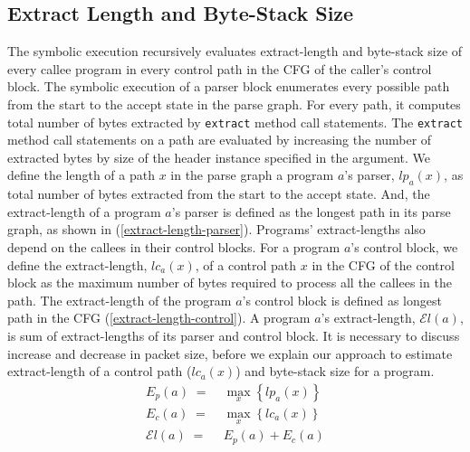 

\subsection{Extract Length and Byte-Stack Size}
\label{subsection:extract-length-and-byte-stack-size}
The symbolic execution recursively evaluates extract-length and byte-stack size of every callee program in every control path in the CFG of the caller's control block.
The symbolic execution of a parser block enumerates every possible path from the start to the accept state in the parse graph.
For every path, it computes total number of bytes extracted by \texttt{extract} method call statements.
The \texttt{extract} method call statements on a path are evaluated by increasing the number of extracted bytes by size of the header instance specified in the argument.
We define the length of a path $x$ in the parse graph a program $a$'s parser, $lp_{a}(x)$, as total number of bytes extracted from the start to the accept state.
And, the extract-length of a program $a$'s parser is defined as the longest path in its parse graph, as shown in (\ref{extract-length-parser}).
Programs' extract-lengths also depend on the callees in their control blocks.
For a program $a$'s control block, we define the extract-length, $lc_{a}(x)$, of a control path $x$ in the CFG of the control block as the maximum number of bytes required to process all the callees in the path.
The extract-length of the program $a$'s control block is defined as longest path in the CFG (\ref{extract-length-control}).
A program $a$'s extract-length, $\mathcal{E}l(a)$, is sum of extract-lengths of its parser and control block.
It is necessary to discuss increase and decrease in packet size, before we explain our approach to estimate extract-length of a control path ($lc_{a}(x)$) and byte-stack size for a program.
\begin{align}
E_{p}(a)\; =& \; \max_{x}\left\{lp_{a}(x)\right\} \label{extract-length-parser} \\
E_{c}(a)\; =& \; \max_{x}\left\{lc_{a}(x)\right\} \label{extract-length-control} \\
\mathcal{E}l(a)\; =& \; E_{p}(a) + E_{c}(a) \label{extract-length-program}
\end{align}



